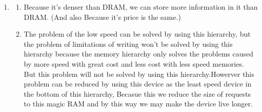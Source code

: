 \documentclass[12pt]{article}
\begin{document}
\begin{enumerate}
        \item
            \begin{enumerate}
                \item
                    Because it's denser than DRAM, we can store more information
                    in it than DRAM. (And also Because it's price is the same.)
                \item
                    The problem of the low speed can be solved by using this
                    hierarchy, but the problem of limitations of writing won't
                    be solved by using this hierarchy because the memory hierarchy
                    only solves the problems caused by more speed with great cost
                    and less cost with less speed memories. But this problem will
                    not be solved by using this hierarchy.Howerver this problem
                    can be reduced by using this device as the least speed device
                    in the bottom of this hierarchy, Becasue this we reduce the
                    size of requests to this magic RAM and by this way we may
                    make the device live longer.
            \end{enumerate}
    \end{enumerate}
\end{document}
